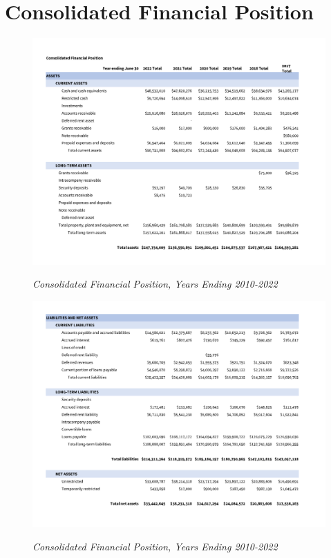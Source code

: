 \chapter{Consolidated Financial Position}\label{ch:consolidated-financial-position}
\begin{figure}[hbt]
    \caption[Consolidated Financial Position, Years Ending 2010–2022]{\textit{Consolidated Financial Position, Years Ending 2010-2022}}\label{fig:consolidated_financial_position_2010-2022-1} %
  \includegraphics[width=\textwidth]{Consolidated_Financial_Statements/v5_Spreadsheets/Consolidated_Financial_Position_Years_2010-2022_PDF_pages/.pg_0001.pdf}\\ %
\end{figure}
\begin{figure}[hbt]
    \caption[Consolidated Financial Position, Years Ending 2010–2022]{\textit{Consolidated Financial Position, Years Ending 2010-2022}}\label{fig:consolidated_financial_position_2010-2022-2} %
    \includegraphics[width=\textwidth]{Consolidated_Financial_Statements/v5_Spreadsheets/Consolidated_Financial_Position_Years_2010-2022_PDF_pages/.pg_0002.pdf}\\ %
\end{figure}
